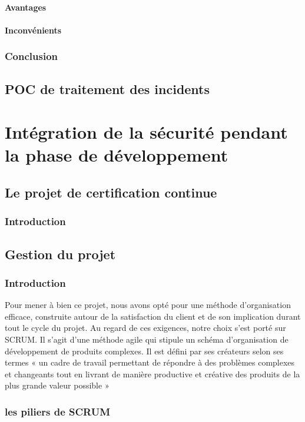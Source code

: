 \documentclass[a4paper,12pt]{book}
\theoremstyle{break}
\begin{document}
\subsection{Avantages}
\subsection{Inconvénients}
\section{Conclusion}



\chapter{POC de traitement des incidents}
\part{Intégration de la sécurité pendant la phase de développement}
\chapter{Le projet de certification continue}
\section{Introduction}
\chapter{Gestion du projet}
\section{Introduction}
Pour mener à bien ce projet, nous avons opté pour une méthode d’organisation efficace, construite autour de la satisfaction du client et de son implication durant tout le cycle du projet. Au regard de ces exigences, notre choix s’est porté sur \ac{SCRUM}.
\newline
Il s'agit d'une méthode agile qui stipule un schéma d’organisation de développement de produits complexes. Il est défini par ses créateurs selon ses termes « un cadre de travail permettant de répondre à des problèmes complexes et changeants tout en livrant de manière productive et créative des produits de la plus grande valeur possible »

\section{les piliers de SCRUM}
\end{document}
